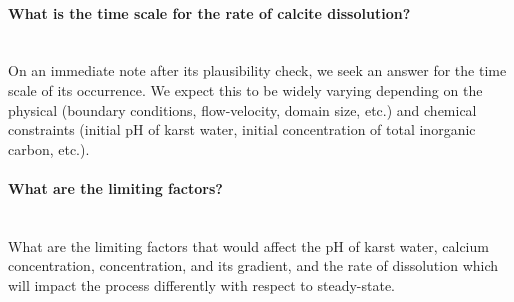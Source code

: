 \paragraph*{What is the time scale for the rate of calcite dissolution?} \mbox{}\\ 
On an immediate note after its plausibility check, 
we seek an answer for the time scale of its occurrence. We expect this to be widely varying depending on the physical (boundary conditions, flow-velocity, 
domain size, etc.) and chemical constraints (initial pH of karst water, initial concentration of total inorganic carbon, etc.).

\paragraph*{What are the limiting factors?} \mbox{}\\ 
What are the limiting factors that would affect the pH of karst water, 
calcium concentration,  concentration, and its gradient, and the rate of dissolution which will impact the process differently 
with respect to steady-state.
\endinput
